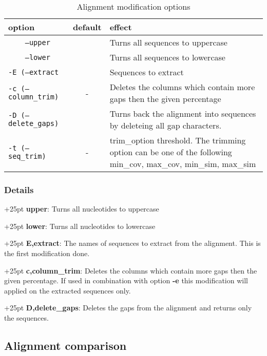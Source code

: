 \documentclass[a4paper,10pt,parskip=half]{scrartcl}
\begin{document}
\begin{table}[h]
\caption{Alignment modification options}
\begin{tabular}{lcp{7cm}}\hline
option& default & effect \\\hline
\texttt{~~~~--upper}  & & Turns all sequences to uppercase\\
\texttt{~~~~--lower}  & &  Turns all sequences to lowercase\\
\texttt{-E (--extract}  & &   Sequences to extract\\
\texttt{-c (--column\_trim)}&-& Deletes the columns which contain more gaps then the given percentage\\
\texttt{-D (--delete\_gaps)}& & Turns back the alignment into sequences by deleteing all gap characters.\\
\texttt{-t (--seq\_trim)} &-&    trim\_option threshold. The trimming option can be one of the following min\_cov, max\_cov, min\_sim, max\_sim\\
\end{tabular}
\end{table}

\subsubsection*{Details}

\hangindent+25pt 
\textbf{upper}: Turns all nucleotides to uppercase

\hangindent+25pt 
\textbf{lower}: Turns all nucleotides to lowercase

\hangindent+25pt 
\textbf{E,extract}: The names of sequences to extract from the alignment. This is the first modification done.

\hangindent+25pt 
\textbf{c,column\_trim}: Deletes the columns which contain more gaps then the given percentage. If used in combination with option \textbf{-e} this modification will applied on the extracted sequences only.

\hangindent+25pt 
\textbf{D,delete\_gaps}: Deletes the gaps from the alignment and returns only the sequences.



\subsection{Alignment comparison}\label{comp_opts}
\end{document}
